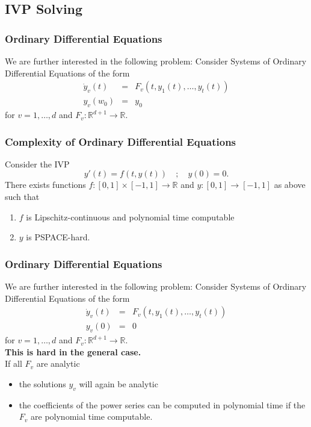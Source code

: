 \documentclass[xcolor=pdftex,dvipsnames,table,handout]{beamer}
\newcommand{\RR}{\ensuremath{\mathbb{R}}}
\begin{document}
\subsection{IVP Solving}
\begin{frame}
  \frametitle{Ordinary Differential Equations}
  We are further interested in the following problem:\newline
Consider Systems of Ordinary Differential Equations of the form
\begin{eqnarray*}
  \dot y_v(t) &=& F_v(t, y_1(t), \dots, y_t(t)) \\
  y_v(w_0) &=& y_0 
\end{eqnarray*}
for $v=1,\dots,d$ and $F_v : \RR^{d+1} \to \RR$.
  \end{frame}
\begin{frame}
\frametitle{Complexity of Ordinary Differential Equations}
\begin{theorem}[Kawamura, 2010]
Consider the IVP
$$
y'(t)=f(t,y(t)) \quad;\quad y(0)=0.
$$
There exists functions $f: [0,1] \times [-1,1] \to \RR$ and  $y: [0,1] \to [-1,1]$  as above such that
\pause
\begin{enumerate}
\item $f$ is Lipschitz-continuous and polynomial time computable
\item $y$ is PSPACE-hard.
\end{enumerate}
\end{theorem}
\end{frame}
\begin{frame}
  \frametitle{Ordinary Differential Equations}
  We are further interested in the following problem:\newline
Consider Systems of Ordinary Differential Equations of the form
\begin{eqnarray*}
  \dot y_v(t) &=& F_v(t, y_1(t), \dots, y_t(t)) \\
  y_v(0) &=& 0 
\end{eqnarray*}
for $v=1,\dots,d$ and $F_v : \RR^{d+1} \to \RR$.\\
\textbf{This is hard in the general case.}\\
\pause
If all $F_v$ are analytic
\begin{itemize}
\item the solutions $y_v$ will again be analytic
\item the coefficients of the power series can be computed in polynomial time if the $F_v$ are polynomial time computable.
\end{itemize}
  \end{frame}
\end{document}
